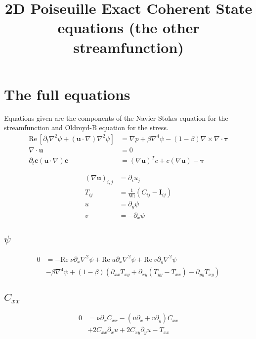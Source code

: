 \documentclass[12,a4paper]{article}
\newcommand{\dd}[1]{\partial_{#1}}
\newcommand{\lpl}{\nabla^{2}}
\newcommand{\bih}{\nabla^{4}}
\newcommand{\Wi}{\mathrm{Wi}}
\newcommand{\Rey}{\mathrm{Re \ }}
\newcommand{\II}{\mathbf{I}}
\begin{document}
\title{2D Poiseuille Exact Coherent State equations (the other streamfunction)}
\maketitle

\section{The full equations}
Equations given are the components of the Navier-Stokes equation for the streamfunction and Oldroyd-B equation for the stress. 
\begin{align}
    \Rey \left[\dd{t} \lpl \psi + \left(\mathbf{u} \cdot \nabla\right) \lpl \psi \right] &=
    \nabla p + \beta \bih \psi - (1-\beta) \nabla \times \nabla \cdot \boldsymbol{\tau} \\  
    \nabla \cdot \mathbf{u} &= 0 \\
    \dd{t} \mathbf{c} \left( \mathbf{u} \cdot \nabla \right) \mathbf{c} &= 
    \left( \nabla \mathbf{u} \right)^{T} c + c \left( \nabla \mathbf{u} \right) -\boldsymbol{\tau}
\end{align}

\begin{align}
    \left(\nabla \mathbf u\right)_{i,j} &= \partial_{i} u_{j} \nonumber\\
    T_{ij} &= \frac{1}{\Wi} (C_{ij} - \II_{ij}) \nonumber\\
    u	   &= \dd{y} \psi \nonumber\\
    v	   &= -\dd{x} \psi \nonumber
\end{align}

\subsection{$\psi$}

\begin{align}
    0 &= - \Rey\nu\dd{x}\lpl\psi + \Rey u \dd{x} \lpl \psi + \Rey v \dd{y} \lpl \psi \nonumber\\
      &- \beta \bih \psi + (1-\beta) \left( \dd{xx} T_{xy} + \dd{xy}(T_{yy} - T_{xx}) - \dd{yy} T_{xy}\right)
\end{align}

\subsection{$C_{xx}$}

\begin{align}
    0 &= \nu \dd{x} C_{xx} - (u\dd{x} + v\dd{y}) C_{xx} \nonumber\\
      &+ 2C_{xx}\dd{x}u + 2C_{xy}\dd{y}u -  T_{xx}
\end{align}
\end{document}
